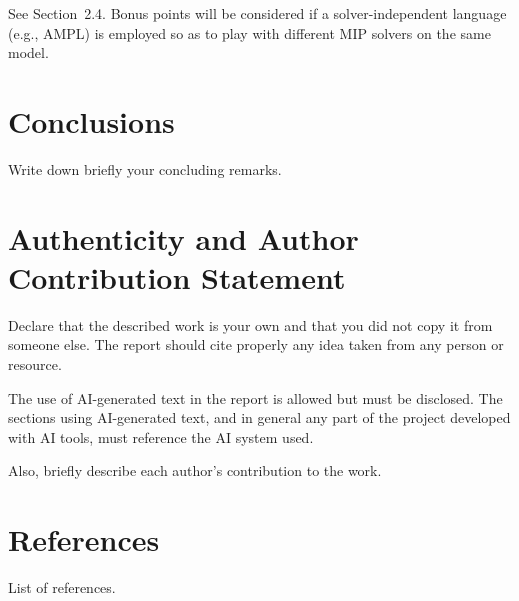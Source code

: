 \documentclass{article}
\begin{document}
See Section~2.4. Bonus points will be considered if a solver-independent language (e.g., AMPL) is employed so as to play with different MIP solvers on the same model.

\section{Conclusions}

Write down briefly your concluding remarks.

\section*{Authenticity and Author Contribution Statement}

Declare that the described work is your own and that you did not copy it from someone else. The report should cite properly any idea taken from any person or resource.

The use of AI-generated text in the report is allowed but must be disclosed. The sections using AI-generated text, and in general any part of the project developed with AI tools, must reference the AI system used.

Also, briefly describe each author's contribution to the work.

\section*{References}

List of references.
\end{document}
